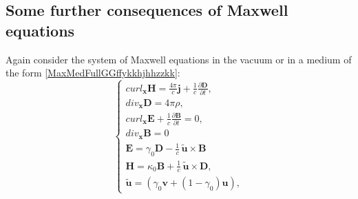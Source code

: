 \documentclass{article}
\theoremstyle{definition}
\theoremstyle{remark}
\renewcommand{\vec}[1]{\mathbf{#1}}
\newcommand{\R}{\mathbb{R}}
\newcommand{\er}{\eqref}
\newcommand{\R}{{\mathbb{R}}}
\newcommand{\er}{\eqref}
\begin{document}
\subsection{Some further consequences of Maxwell equations}
Again consider the system of Maxwell equations in the vacuum or in a
medium of the form \er{MaxMedFullGGffykkhjhhzzkk}:
\begin{equation}\label{MaxVacFullPPNffGGint}
\begin{cases}
curl_{\vec x} \vec H=\frac{4\pi}{c}\vec j+
\frac{1}{c}\frac{\partial \vec D}{\partial t},\\
div_{\vec x} \vec D=4\pi\rho,\\
curl_{\vec x} \vec E+\frac{1}{c}\frac{\partial \vec B}{\partial t}=0,\\
div_{\vec x} \vec B=0\\
\vec E=\gamma_0\vec D-\frac{1}{c}\,\vec {\tilde u}\times \vec B\\
\vec H=\kappa_0\vec B+\frac{1}{c}\,\vec {\tilde u}\times \vec D,\\
\vec {\tilde u}=\left(\gamma_0\vec v+(1-\gamma_0)\vec u\right),
\end{cases}
\end{equation}
%
%
%
\begin{comment}
\begin{equation}\label{MaxVacFullPPNffGGint}
\begin{cases}
curl_{\vec x} \vec H\equiv \frac{4\pi}{c}\vec
j+\frac{1}{c}\frac{\partial
\vec D}{\partial t},\\
div_{\vec x} \vec D\equiv 4\pi\rho,\\
curl_{\vec x} \vec E+\frac{1}{c}\frac{\partial \vec B}{\partial t}\equiv 0,\\
div_{\vec x} \vec B\equiv 0,\\
\vec E=\vec D-\frac{1}{c}\,\vec v\times \vec B,\\
\vec H=\vec B+\frac{1}{c}\,\vec v\times \vec D,
\end{cases}
\end{equation}
\end{comment}
\end{document}
